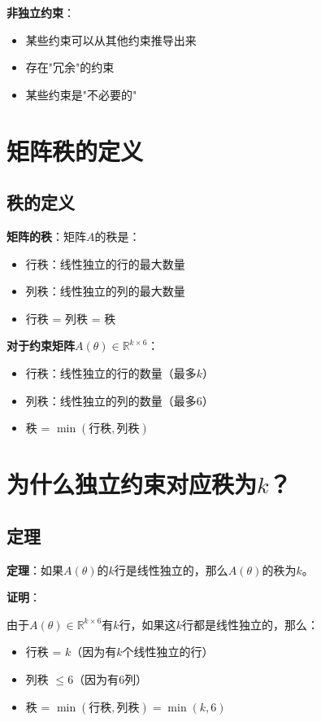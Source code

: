 \documentclass[12pt,a4paper]{article}
\begin{document}
\textbf{非独立约束}：
\begin{itemize}
\item 某些约束可以从其他约束推导出来
\item 存在"冗余"的约束
\item 某些约束是"不必要的"
\end{itemize}

\section{矩阵秩的定义}

\subsection{秩的定义}

\textbf{矩阵的秩}：矩阵$A$的秩是：
\begin{itemize}
\item 行秩：线性独立的行的最大数量
\item 列秩：线性独立的列的最大数量
\item 行秩 = 列秩 = 秩
\end{itemize}

\textbf{对于约束矩阵$A(\theta) \in \mathbb{R}^{k \times 6}$}：
\begin{itemize}
\item 行秩：线性独立的行的数量（最多$k$）
\item 列秩：线性独立的列的数量（最多$6$）
\item 秩 = $\min(\text{行秩}, \text{列秩})$
\end{itemize}

\section{为什么独立约束对应秩为$k$？}

\subsection{定理}

\textbf{定理}：如果$A(\theta)$的$k$行是线性独立的，那么$A(\theta)$的秩为$k$。

\textbf{证明}：

由于$A(\theta) \in \mathbb{R}^{k \times 6}$有$k$行，如果这$k$行都是线性独立的，那么：
\begin{itemize}
\item 行秩 = $k$（因为有$k$个线性独立的行）
\item 列秩 $\leq 6$（因为有$6$列）
\item 秩 = $\min(\text{行秩}, \text{列秩}) = \min(k, 6)$
\end{itemize}
\end{document}
